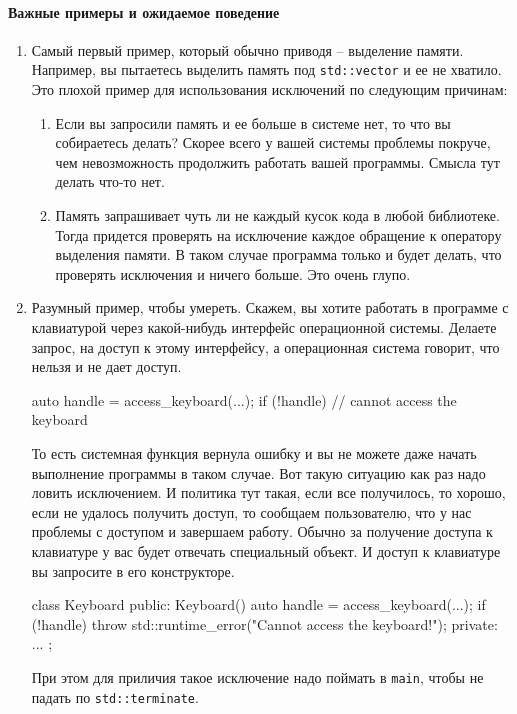 \paragraph{Важные примеры и ожидаемое поведение}

\begin{enumerate}
\item Самый первый пример, который обычно приводя -- выделение памяти.
Например, вы пытаетесь выделить память под \verb"std::vector" и ее не хватило.
Это плохой пример для использования исключений по следующим причинам:
\begin{enumerate}
\item Если вы запросили память и ее больше в системе нет, то что вы собираетесь делать?
Скорее всего у вашей системы проблемы покруче, чем невозможность продолжить работать вашей программы.
Смысла тут делать что-то нет.

\item Память запрашивает чуть ли не каждый кусок кода в любой библиотеке.
Тогда придется проверять на исключение каждое обращение к оператору выделения памяти.
В таком случае программа только и будет делать, что проверять исключения и ничего больше.
Это очень глупо.
\end{enumerate}

\item
\label{item::example::ExceptionDie}
Разумный пример, чтобы умереть.
Скажем, вы хотите работать в программе с клавиатурой через какой-нибудь интерфейс операционной системы.
Делаете запрос, на доступ к этому интерфейсу, а операционная система говорит, что нельзя и не дает доступ.
\begin{cppcode}
auto handle = access_keyboard(...);
if (!handle) {
  // cannot access the keyboard
}
\end{cppcode}
То есть системная функция вернула ошибку и вы не можете даже начать выполнение программы в таком случае.
Вот такую ситуацию как раз надо ловить исключением.
И политика тут такая, если все получилось, то хорошо, если не удалось получить доступ, то сообщаем пользователю, что у нас проблемы с доступом и завершаем работу.
Обычно за получение доступа к клавиатуре у вас будет отвечать специальный объект.
И доступ к клавиатуре вы запросите в его конструкторе.
\begin{cppcode}
class Keyboard {
public:
  Keyboard() {
    auto handle = access_keyboard(...);
    if (!handle)
      throw std::runtime_error("Cannot access the keyboard!");
  }
private:
  ...
};
\end{cppcode}
При этом для приличия такое исключение надо поймать в \verb"main", чтобы не падать по \verb"std::terminate".


\end{enumerate}
